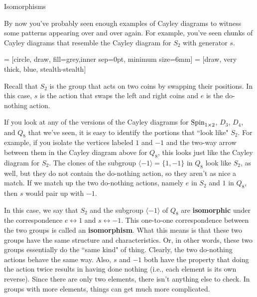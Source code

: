 \begin{section}{Isomorphisms}

By now you've probably seen enough examples of Cayley diagrams to witness some patterns appearing over and over again.  For example, you've seen chunks of Cayley diagrams that resemble the Cayley diagram for $S_2$ with generator $s$.

 = [circle, draw, fill=grey,inner sep=0pt, minimum size=6mm]
 = [draw, very thick, blue, stealth-stealth]

\begin{center}
\end{center}

\noindent Recall that $S_2$ is the group that acts on two coins by swapping their positions.  In this case, $s$ is the action that swaps the left and right coins and $e$ is the do-nothing action.  

If you look at any of the versions of the Cayley diagrams for $\operatorname{Spin}_{1\times 2}$, $D_3$, $D_4$, and $Q_8$ that we've seen, it is easy to identify the portions that ``look like" $S_2$.  For example, if you isolate the vertices labeled $1$ and $-1$ and the two-way arrow between them in the Cayley diagram above for $Q_8$, this looks just like the Cayley diagram for $S_2$.  The clones of the subgroup $\langle -1\rangle=\{1,-1\}$ in $Q_8$ look like $S_2$, as well, but they do not contain the do-nothing action, so they aren't as nice a match.  If we match up the two do-nothing actions, namely $e$ in $S_2$ and $1$ in $Q_8$, then $s$ would pair up with $-1$.

In this case, we say that $S_2$ and the subgroup $\langle -1\rangle$ of $Q_8$ are \textbf{isomorphic} under the correspondence $e\leftrightarrow 1$ and $s\leftrightarrow -1$.  This one-to-one correspondence between the two groups is called an \textbf{isomorphism}.  What this means is that these two groups have the same structure and characteristics.  Or, in other words, these two groups essentially do the ``same kind" of thing.  Clearly, the two do-nothing actions behave the same way.  Also, $s$ and $-1$ both have the property that doing the action twice results in having done nothing (i.e., each element is its own reverse).  Since there are only two elements, there isn't anything else to check.  In groups with more elements, things can get much more complicated.  


\end{section}
